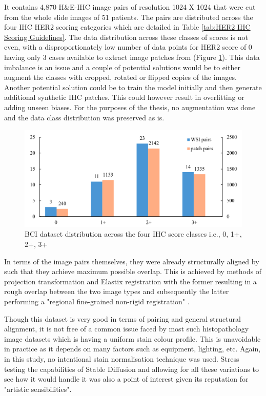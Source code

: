 It contains 4,870 H\&E-IHC image pairs of resolution 1024 X 1024 that were cut from the whole slide images of 51 patients. The pairs are distributed across the four IHC HER2 scoring categories which are detailed in Table \ref{tab:HER2 IHC Scoring Guidelines}. The data distribution across these classes of scores is not even, with a disproportionately low number of data points for HER2 score of 0 having only 3 cases available to extract image patches from (Figure \ref{fig:BCI-data-dist}). This data imbalance is an issue and a couple of  potential solutions would be to either augment the classes with cropped, rotated or flipped copies of the images. Another potential solution could be to train the model initially and then generate additional synthetic IHC patches. This could however result in overfitting or adding unseen biases. For the purposes of the thesis, no augmentation was done and the data class distribution was preserved as is.
\begin{figure}[h]
    \centering
    \includegraphics[width=1\linewidth]{4_ResearchMethodology/figures/dataDistribution.png}
    \caption[BCI data distribution]{BCI dataset distribution across the four IHC score classes i.e., 0, 1+, 2+, 3+ \parencite[Figure 8, p. 5]{Liu2022BCI:Pix2pix}}
    \label{fig:BCI-data-dist}
\end{figure}

In terms of the image pairs themselves, they were already structurally aligned by \textcite{Liu2022BCI:Pix2pix} such that they achieve maximum possible overlap. This is achieved by methods of projection transformation and Elastix registration \parencite{Klein2010Elastix:Registration}  with the former resulting in a rough overlap between the two image types and subsequently the latter performing a "regional fine-grained non-rigid registration" \parencite[p. 5]{Liu2022BCI:Pix2pix}. 

Though this dataset is very good in terms of pairing and general structural alignment, it is not free of a common issue faced by most such histopathology image datasets which is having a uniform stain colour profile. This is unavoidable in practice as it depends on many factors such as equipment, lighting, etc. Again, in this study, no intentional stain normalisation technique was used. Stress testing the capabilities of Stable Diffusion and allowing for all these variations to see how it would handle it was also a point of interest given its reputation for "artistic sensibilities".

